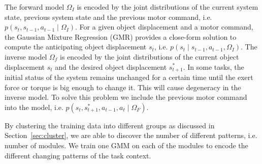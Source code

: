 
The forward model $\Omega_I$ is encoded by the joint distributions of the current system state, previous system state and the previous motor command, i.e. $p(s_t,s_{t-1},a_{t-1}\mid{\Omega_I})$. For a given object displacement and a motor command, the Gaussian Mixture Regression (GMR) provides a close-form solution to compute the anticipating object displacement $s_t$, i.e. $p(s_t{\mid}s_{t-1},a_{t-1},{\Omega_I})$. The inverse model $\Omega_f$ is encoded by the joint distributions of the current object displacement $s_t$ and the desired object displacement $s^{*}_{t+1}$. In some tasks, the initial status of the system remains unchanged for a certain time until the exert force or torque is big enough to change it. This will cause degeneracy in the inverse model. To solve this problem we include the previous motor command into the model, i.e. $p(s_t,s^{*}_{t+1},a_{t-1},a_t{\mid}{\Omega_F})$.



By clustering the training data into different groups as discussed in Section~\ref{sec:cluster}, we are able to discover the number of different patterns, i.e. number of modules. We train one GMM on each of the modules to encode the different changing patterns of the task context.


